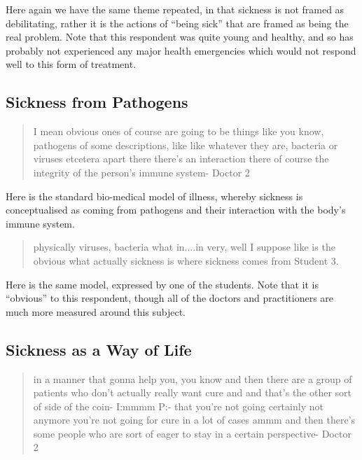 Here again we have the same theme repeated, in that sickness is not framed as debilitating, rather it is the actions of ``being sick'' that are framed as being the real problem. Note that this respondent was quite young and healthy, and so has probably not experienced any major health emergencies which would not respond well to this form of treatment. 

\subsection{Sickness from Pathogens}
\label{sec:sickn-from-path}

\begin{quotation}
  I mean obvious ones of course are going to be things like you know, pathogens of some descriptions, like like whatever they are, bacteria or viruses etcetera apart there there's an interaction there of course the integrity of the person's immune system-
Doctor 2
\end{quotation}

Here is the standard bio-medical model of illness, whereby sickness is conceptualised as coming from pathogens and their interaction with the body's immune system. 

\begin{quotation}
  physically viruses, bacteria what in....in very, well I suppose like is the obvious what actually sickness is where sickness comes from
Student 3.
\end{quotation}

Here is the same model, expressed by one of the students. Note that it is ``obvious'' to this respondent, though all of the doctors and practitioners are much more measured around this subject. 


\subsection{Sickness as a Way of Life}
\label{sec:sickness-as-way}

\begin{quotation}
   in a manner that gonna help you, you know and then there are a group of patients who don't actually really want cure and and that's the other sort of side of the coin-
I:mmmm
P:- that you're not going certainly not anymore you're not going for cure in a lot of cases ammm and then there's some people who are sort of eager to stay in a certain perspective-
Doctor 2
\end{quotation}



